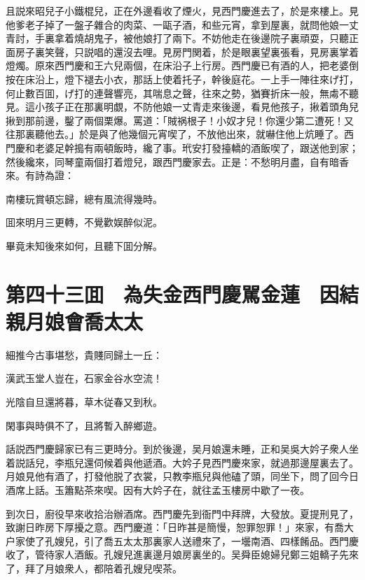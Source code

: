 且説來昭兒子小鐵棍兒，正在外邊看收了煙火，見西門慶進去了，於是來樓上。見他爹老子掉了一盤子雜合的肉菜、一甌子酒，和些元宵，拿到屋裏，就問他娘一丈青討，手裏拿着燒胡鬼子，被他娘打了兩下。不妨他走在後邊院子裏頑耍，只聽正面房子裏笑聲，只説唱的還沒去哩。見房門関着，於是眼裏望裏張看，見房裏掌着燈燭。原來西門慶和王六兒兩個，在床沿子上行房。西門慶已有酒的人，把老婆倒按在床沿上，燈下褪去小衣，那話上使着托子，幹後庭花。一上手一陣往來げ打，何止數百囬，げ打的連聲響亮，其喘息之聲，往來之勢，猶賽折床一般，無䖏不聽見。這小孩子正在那裏明覷，不防他娘一丈青走來後邊，看見他孩子，揪着頭角兒揪到那前邊，鑿了兩個栗爆。罵道：「賊祸根子！小奴才兒！你還少第二遭死！又往那裏聽他去。」於是與了他幾個元宵喫了，不放他出來，就嚇住他上炕睡了。西門慶和老婆足幹搗有兩頓飯時，纔了事。玳安打發擡轎的酒飯喫了，跟送他到家；然後纔來，同琴童兩個打着燈兒，跟西門慶家去。正是：不愁明月盡，自有暗香來。有詩為證：

南樓玩賞頓忘歸，總有風流得幾時。

囬來明月三更轉，不覺歡娱醉似泥。

畢竟未知後來如何，且聽下囬分解。

\chapter*{第四十三囬　為失金西門慶駡金蓮　因結親月娘會喬太太}

細推今古事堪愁，貴賤同歸土一丘：

漢武玉堂人豈在，石家金谷水空流！

光陰自旦還將暮，草木従春又到秋。

閑事與時俱不了，且將暫入醉鄉遊。

話説西門慶歸家已有三更時分。到於後邊，吴月娘還未睡，正和吴吳大妗子衆人坐着説話兒，李瓶兒還伺候着與他遞酒。大妗子見西門慶來家，就過那邊屋裏去了。月娘見他有酒了，打發他脱了衣裳，只教李瓶兒與他磕了頭，同坐下，問了回今日酒席上話。玉簫點茶來喫。因有大妗子在，就往孟玉樓房中歇了一夜。

到次日，廚役早來收拾治辦酒席。西門慶先到衙門中拜牌，大發放。夏提刑見了，致謝日昨房下厚擾之意。西門慶道：「日昨甚是簡慢，恕罪恕罪！」來家，有喬大户家使了孔嫂兒，引了喬五太太那裏家人送禮來了，一壜南酒、四樣餚品。西門慶收了，管待家人酒飯。孔嫂兒進裏邊月娘房裏坐的。吴舜臣媳婦兒鄭三姐轎子先來了，拜了月娘衆人，都陪着孔嫂兒喫茶。

